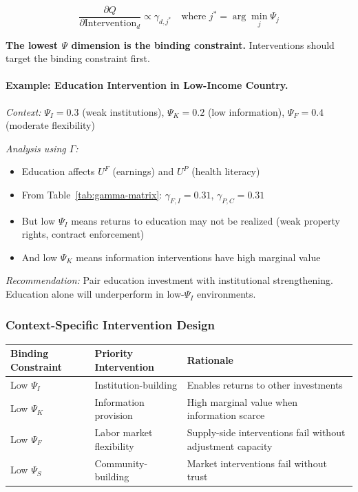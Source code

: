 \begin{equation}
  \frac{\partial Q}{\partial \text{Intervention}_d} \propto \gamma_{d,j^*} \quad \text{where } j^* = \arg\min_j \Psi_j
  \label{eq:sequencing}
\end{equation}

\textbf{The lowest $\Psi$ dimension is the binding constraint.}
Interventions should target the binding constraint first.

\paragraph{Example: Education Intervention in Low-Income Country.}

\textit{Context:} $\Psi_I = 0.3$ (weak institutions), $\Psi_K = 0.2$ (low information), $\Psi_F = 0.4$ (moderate flexibility)

\textit{Analysis using $\Gamma$:}
\begin{itemize}
  \item Education affects $U^F$ (earnings) and $U^P$ (health literacy)
  \item From Table~\ref{tab:gamma-matrix}: $\gamma_{F,I} = 0.31$, $\gamma_{P,C} = 0.31$
  \item But low $\Psi_I$ means returns to education may not be realized (weak property rights, contract enforcement)
  \item And low $\Psi_K$ means information interventions have high marginal value
\end{itemize}

\textit{Recommendation:} Pair education investment with institutional strengthening.
Education alone will underperform in low-$\Psi_I$ environments.

\subsubsection{Context-Specific Intervention Design}

\begin{center}
\small
\begin{tabular}{lll}
\hline
\textbf{Binding Constraint} & \textbf{Priority Intervention} & \textbf{Rationale} \\
\hline
Low $\Psi_I$ & Institution-building & Enables returns to other investments \\
Low $\Psi_K$ & Information provision & High marginal value when information scarce \\
Low $\Psi_F$ & Labor market flexibility & Supply-side interventions fail without adjustment capacity \\
Low $\Psi_S$ & Community-building & Market interventions fail without trust \\
\hline
\end{tabular}
\end{center}

